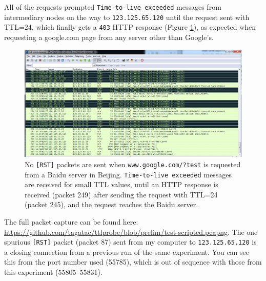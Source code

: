All of the requests prompted \texttt{Time-to-live exceeded} messages from intermediary nodes on the way to \texttt{123.125.65.120} until the request sent with TTL=24, which finally gets a \texttt{403} HTTP response (Figure \ref{fig_gfwtest}), as expected when requesting a google.com page from any server other than Google's.
\begin{figure}
	\includegraphics[width=\textwidth]{figures/gfwtest}
	\caption{
		No \texttt{[RST]} packets are sent when \texttt{www.google.com/?test} is requested from a Baidu server in Beijing.
		\texttt{Time-to-live exceeded} messages are received for small TTL values, until an HTTP response is received (packet 249) after sending the request with TTL=24 (packet 245), and the request reaches the Baidu server.
	}
	\label{fig_gfwtest}
\end{figure}
The full packet capture can be found here: \url{https://github.com/tagatac/ttlprobe/blob/prelim/test-scripted.pcapng}.
The one spurious \texttt{[RST]} packet (packet 87) sent from my computer to \texttt{123.125.65.120} is a closing connection from a previous run of the same experiment.
You can see this from the port number used (55785), which is out of sequence with those from this experiment (55805--55831).
